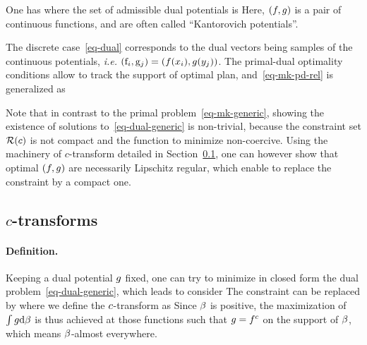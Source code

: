 	
\begin{prop}
	One has
	where the set of admissible dual potentials is
	Here, $(f,g)$ is a pair of continuous functions, and are often called ``Kantorovich potentials''.
\end{prop}

The discrete case~\eqref{eq-dual} corresponds to the dual vectors being samples of the continuous potentials, \emph{i.e.} $(\mathrm{f}_i,\mathrm{g}_j)=(f(x_i),g(y_j))$. 
	The primal-dual optimality conditions allow to track the support of optimal plan, and~\eqref{eq-mk-pd-rel} is generalized as 
	
	Note that in contrast to the primal problem~\eqref{eq-mk-generic}, showing the existence of solutions to~\eqref{eq-dual-generic} is non-trivial, because the constraint set $\mathcal{R}(c)$ is not compact and the function to minimize non-coercive.
	Using the machinery of $c$-transform detailed in Section~\ref{sec-c-transfo}, one can however show that optimal $(f,g)$ are necessarily Lipschitz regular, which enable to replace the constraint by a compact one. 



\subsection{$c$-transforms}
\label{sec-c-transfo}

\paragraph{Definition.}

Keeping a dual potential $g$ fixed, one can try to minimize in closed form the dual problem~\eqref{eq-dual-generic}, which leads to consider
The constraint can be replaced by
where we define the $c$-transform as 
Since $\beta$ is positive, the maximization of $\int g \mathrm{d} \beta$ is thus achieved at those functions such that $g=f^c$ on the support of $\beta$, which means $\beta$-almost everywhere.

